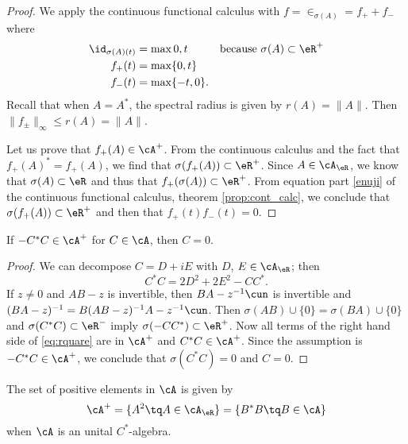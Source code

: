 \begin{proof}
We apply the continuous functional calculus with $f=\in_{\sigma(A)}=f_++f_-$ where
\begin{equation} \label{eq:rrdeux}
\begin{aligned}
  \id_{\sigma(A)(t)}&=\max{0,t}&&\textrm{because $\sigma(A)\subset\eR^+$}\\
  f_+(t)&=\max\{ 0,t \}\\
  f_-(t)&=\max\{ -t,0 \}.
\end{aligned}
\end{equation}
Recall that when $A=A^*$, the spectral radius is given by $r(A)=\| A \|$. Then $\| f_{\pm} \|_{\infty}\leq r(A)=\| A \|$.

Let us prove that $f_+(A)\in\cA^+$. From the continuous calculus and the fact that $f_+(A)^*=f_+(A)$, we find that $\sigma(f_+(A))\subset\eR^+$. Since $A\in\cA_{\eR}$, we know that $\sigma(A)\subset\eR$ and thus that $f_+(\sigma(A))\subset\eR^+$. From equation part \ref{enuji} of the continuous functional calculus, theorem \ref{prop:cont_calc}, we conclude that $\sigma(f_+(A))\subset\eR^+$ and then that $f_+(t)f_-(t)=0$.
\end{proof}

\begin{lemma} \label{lem:rtrois}
If $-C^*C\in\cA^+$ for $C\in\cA$, then $C=0$.
\end{lemma}

\begin{proof}
We can decompose $C=D+iE$ with $D$, $E\in\cA_{\eR}$; then 
\begin{equation}  \label{eq:rquare}
C^*C=2D^2+2E^2-CC^*.
\end{equation}
 If $z\neq 0$ and $AB-z$ is invertible, then $BA-z^{-1}\cun$ is invertible and $(BA-z)^{-1}=B(AB-z)^{-1}A-z^{-1}\cun$. Then $\sigma(AB)\cup\{ 0 \}=\sigma(BA)\cup\{ 0 \}$ and $\sigma(C^*C)\subset\eR^-$ imply $\sigma(-CC^*)\subset\eR^+$. Now all terms of the right hand side of \eqref{eq:rquare} are in $\cA^+$ and $C^*C\in\cA^+$. Since the assumption is $-C^*C\in\cA^+$, we conclude that $\sigma(C^*C)=0$ and $C=0$. 
\end{proof}


\begin{theorem}     \label{ThoElsPositifsBBstar}
The set of positive elements in $\cA$ is given by
\begin{equation}
\cA^+=\{ A^2\tq A\in\cA_{\eR} \}=\{ B^*B\tq B\in\cA \}
\end{equation}
when $\cA$ is an unital $C^*$-algebra.
\end{theorem}


